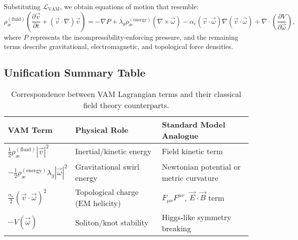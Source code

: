 Substituting $\mathcal{L}_{\text{VAM}}$, we obtain equations of motion that resemble:
\begin{equation}
\rho_\text{\ae}^{(\text{fluid})} \left( \frac{\partial \vec{v}}{\partial t} + (\vec{v} \cdot \nabla)\vec{v} \right)
= - \nabla P
+ \lambda_g \rho_\text{\ae}^{(\text{energy})} (\nabla \times \vec{\omega})
- \alpha_e (\vec{v} \cdot \vec{\omega}) \nabla (\vec{v} \cdot \vec{\omega})
+ \nabla \cdot \left( \frac{\partial V}{\partial \vec{\omega}} \right),
\end{equation}
where $P$ represents the incompressibility-enforcing pressure, and the remaining terms describe gravitational, electromagnetic, and topological force densities.

\subsection{Unification Summary Table}

\begin{table}[H]
\centering
\renewcommand{\arraystretch}{1.3}
\begin{tabular}{|l|l|l|}
\hline
\textbf{VAM Term} & \textbf{Physical Role} & \textbf{Standard Model Analogue} \\
\hline
$\frac{1}{2} \rho_\text{\ae}^{(\text{fluid})} |\vec{v}|^2$ & Inertial/kinetic energy & Field kinetic term \\
$-\frac{1}{2} \rho_\text{\ae}^{(\text{energy})} \lambda_g |\vec{\omega}|^2$ & Gravitational swirl energy & Newtonian potential or metric curvature \\
$\frac{\alpha_e}{2} (\vec{v} \cdot \vec{\omega})^2$ & Topological charge (EM helicity) & $F_{\mu\nu}F^{\mu\nu}$, $\vec{E}\cdot\vec{B}$ term \\
$-V(\vec{\omega})$ & Soliton/knot stability & Higgs-like symmetry breaking \\
\hline
\end{tabular}
\caption{Correspondence between VAM Lagrangian terms and their classical field theory counterparts.}
\end{table}


